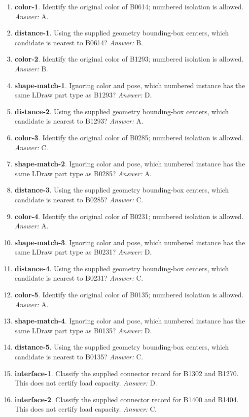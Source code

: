 \begin{enumerate}
\item \textbf{color-1}. Identify the original color of B0614; numbered isolation is allowed. \textit{Answer:} A.
\item \textbf{distance-1}. Using the supplied geometry bounding-box centers, which candidate is nearest to B0614? \textit{Answer:} B.
\item \textbf{color-2}. Identify the original color of B1293; numbered isolation is allowed. \textit{Answer:} B.
\item \textbf{shape-match-1}. Ignoring color and pose, which numbered instance has the same LDraw part type as B1293? \textit{Answer:} D.
\item \textbf{distance-2}. Using the supplied geometry bounding-box centers, which candidate is nearest to B1293? \textit{Answer:} A.
\item \textbf{color-3}. Identify the original color of B0285; numbered isolation is allowed. \textit{Answer:} C.
\item \textbf{shape-match-2}. Ignoring color and pose, which numbered instance has the same LDraw part type as B0285? \textit{Answer:} A.
\item \textbf{distance-3}. Using the supplied geometry bounding-box centers, which candidate is nearest to B0285? \textit{Answer:} C.
\item \textbf{color-4}. Identify the original color of B0231; numbered isolation is allowed. \textit{Answer:} A.
\item \textbf{shape-match-3}. Ignoring color and pose, which numbered instance has the same LDraw part type as B0231? \textit{Answer:} D.
\item \textbf{distance-4}. Using the supplied geometry bounding-box centers, which candidate is nearest to B0231? \textit{Answer:} C.
\item \textbf{color-5}. Identify the original color of B0135; numbered isolation is allowed. \textit{Answer:} A.
\item \textbf{shape-match-4}. Ignoring color and pose, which numbered instance has the same LDraw part type as B0135? \textit{Answer:} D.
\item \textbf{distance-5}. Using the supplied geometry bounding-box centers, which candidate is nearest to B0135? \textit{Answer:} C.
\item \textbf{interface-1}. Classify the supplied connector record for B1302 and B1270. This does not certify load capacity. \textit{Answer:} D.
\item \textbf{interface-2}. Classify the supplied connector record for B1400 and B1404. This does not certify load capacity. \textit{Answer:} C.

\end{enumerate}
